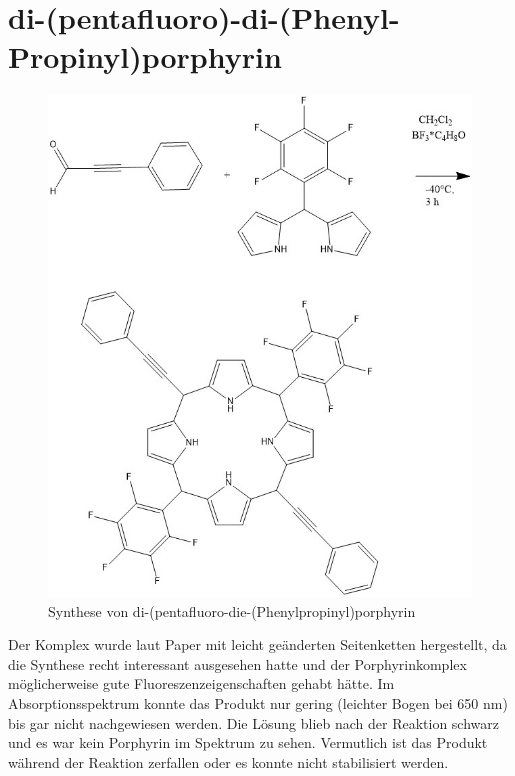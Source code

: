 \section{di-(pentafluoro)-di-(Phenyl-Propinyl)porphyrin}
\begin{figure}[!htpb]
\centering
\includegraphics[scale=0.5]{graphics/bis(pentafluorphenyl)-bis(phenylpropinyl)porphyrin}
\caption{Synthese von di-(pentafluoro-die-(Phenylpropinyl)porphyrin}
\end{figure}
Der Komplex wurde laut Paper \cite{16} %
mit leicht geänderten Seitenketten hergestellt, da die Synthese recht interessant ausgesehen hatte und der Porphyrinkomplex möglicherweise gute Fluoreszenzeigenschaften gehabt hätte. Im Absorptionsspektrum konnte das Produkt nur gering (leichter Bogen bei 650 nm) bis gar nicht nachgewiesen werden.
Die Lösung blieb nach der Reaktion schwarz und es war kein Porphyrin im Spektrum zu sehen. Vermutlich ist das Produkt während der Reaktion zerfallen oder es konnte nicht stabilisiert werden.

